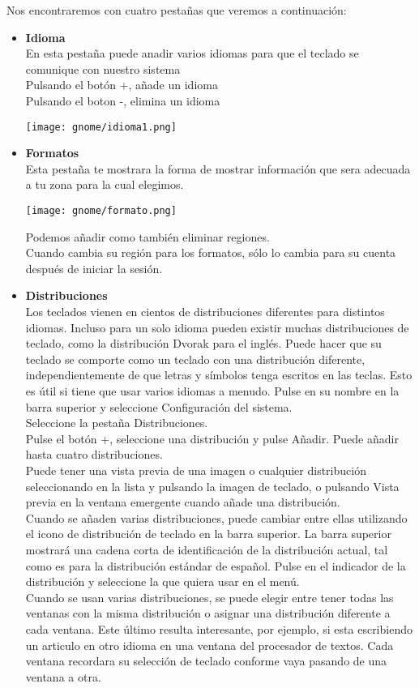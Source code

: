 \documentclass[12pt,letterpaper]{book}
\begin{document}
Nos encontraremos con cuatro pestañas que veremos a continuación:
\begin{itemize}
	\item {\large \bf Idioma}\\
	En esta pestaña puede anadir varios idiomas para que el teclado se comunique con nuestro sistema\\
    Pulsando el botón +, añade un idioma\\
    Pulsando el boton -, elimina un idioma
\begin{center}
\texttt{[image: gnome/idioma1.png]} 
\end{center}
	\item {\large \bf Formatos}\\
		Esta pestaña te mostrara la forma de mostrar información que sera adecuada a tu zona para la cual elegimos.
\begin{center}
\texttt{[image: gnome/formato.png]} 
\end{center}
Podemos añadir como también eliminar regiones.\\ 
		Cuando cambia su región para los formatos, sólo lo cambia para su cuenta después de iniciar la sesión.
	\item {\large \bf Distribuciones}\\
	Los teclados vienen en cientos de distribuciones diferentes para distintos idiomas. Incluso para un solo idioma pueden existir muchas distribuciones de teclado, como la distribución Dvorak para el inglés. Puede hacer que su teclado se comporte como un teclado con una distribución diferente, independientemente de que letras y símbolos tenga escritos en las teclas. Esto es útil si tiene que usar varios idiomas a menudo.
Pulse en su nombre en la barra superior y seleccione Configuración del sistema.\\

Seleccione la pestaña Distribuciones.\\
Pulse el botón +, seleccione una distribución y pulse Añadir. Puede añadir hasta cuatro distribuciones.\\
Puede tener una vista previa de una imagen o cualquier distribución seleccionando en la lista y pulsando la imagen de teclado, o pulsando Vista previa en la ventana emergente cuando añade una distribución.\\
Cuando se añaden varias distribuciones, puede cambiar entre ellas utilizando el icono de distribución de teclado en la barra superior. La barra superior mostrará una cadena corta de identificación de la distribución actual, tal como es para la distribución estándar de español. Pulse en el indicador de la distribución y seleccione la que quiera usar en el menú.\\
Cuando se usan varias distribuciones, se puede elegir entre tener todas las ventanas con la misma distribución o asignar una distribución diferente a cada ventana. Este último resulta interesante, por ejemplo, si esta escribiendo un articulo en otro idioma en una ventana del procesador de textos. Cada ventana recordara su selección de teclado conforme vaya pasando de una ventana a otra.\\


\end{itemize}
\end{document}
